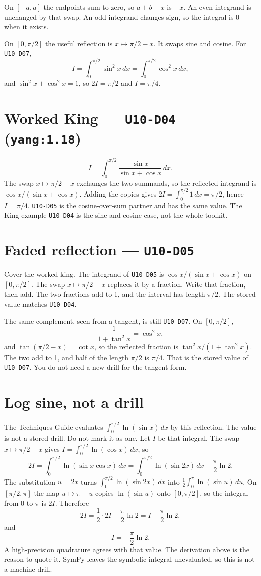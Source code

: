 On $[-a,a]$ the endpoints sum to zero, so $a+b-x$ is $-x$.
An even integrand is unchanged by that swap.
An odd integrand changes sign, so the integral is 0 when it exists.

On $[0,\pi/2]$ the useful reflection is $x\mapsto\pi/2-x$.
It swaps sine and cosine. For \texttt{U10-D07},
\[
I=\int_0^{\pi/2}\sin^2 x\,dx
=\int_0^{\pi/2}\cos^2 x\,dx,
\]
and $\sin^2 x+\cos^2 x=1$, so $2I=\pi/2$ and $I=\pi/4$.

\section{Worked King --- \texttt{U10-D04} (\texttt{yang:1.18})}
\[
I=\int_0^{\pi/2}\frac{\sin x}{\sin x+\cos x}\,dx.
\]
The swap $x\mapsto\pi/2-x$ exchanges the two summands, so the reflected integrand is $\cos x/(\sin x+\cos x)$. Adding the copies gives $2I=\int_0^{\pi/2} 1\,dx=\pi/2$, hence $I=\pi/4$.
\texttt{U10-D05} is the cosine-over-sum partner and has the same value. The King example \texttt{U10-D04} is the sine and cosine case, not the whole toolkit.

\section{Faded reflection --- \texttt{U10-D05}}
Cover the worked king. The integrand of \texttt{U10-D05} is $\cos x/(\sin x+\cos x)$ on $[0,\pi/2]$. The swap $x\mapsto\pi/2-x$ replaces it by a fraction. Write that fraction, then add. The two fractions add to 1, and the interval has length $\pi/2$. The stored value matches \texttt{U10-D04}.

The same complement, seen from a tangent, is still \texttt{U10-D07}. On $[0,\pi/2]$,
\[
\frac{1}{1+\tan^2 x}=\cos^2 x,
\]
and $\tan(\pi/2-x)=\cot x$, so the reflected fraction is $\tan^2 x/(1+\tan^2 x)$. The two add to 1, and half of the length $\pi/2$ is $\pi/4$. That is the stored value of \texttt{U10-D07}. You do not need a new drill for the tangent form.

\section{Log sine, not a drill}
The Techniques Guide evaluates $\int_0^{\pi/2}\ln(\sin x)\,dx$ by this reflection. The value is not a stored drill. Do not mark it as one.
Let $I$ be that integral. The swap $x\mapsto\pi/2-x$ gives $I=\int_0^{\pi/2}\ln(\cos x)\,dx$, so
\[
2I=\int_0^{\pi/2}\ln(\sin x\cos x)\,dx
=\int_0^{\pi/2}\ln(\sin 2x)\,dx-\frac\pi2\ln 2.
\]
The substitution $u=2x$ turns $\int_0^{\pi/2}\ln(\sin 2x)\,dx$ into $\frac12\int_0^\pi\ln(\sin u)\,du$. On $[\pi/2,\pi]$ the map $u\mapsto\pi-u$ copies $\ln(\sin u)$ onto $[0,\pi/2]$, so the integral from $0$ to $\pi$ is $2I$. Therefore
\[
2I=\frac12\cdot 2I-\frac\pi2\ln 2=I-\frac\pi2\ln 2,
\]
and
\[
I=-\frac\pi2\ln 2.
\]
A high-precision quadrature agrees with that value. The derivation above is the reason to quote it. SymPy leaves the symbolic integral unevaluated, so this is not a machine drill.

